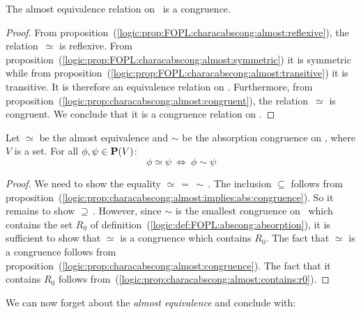 \begin{prop}\label{logic:prop:characabscong:almost:congruence}
The almost equivalence relation on \pv\ is a congruence.
\end{prop}
\begin{proof}
From
proposition~(\ref{logic:prop:FOPL:characabscong:almost:reflexive}),
the relation~$\simeq$ is reflexive. From
proposition~(\ref{logic:prop:FOPL:characabscong:almost:symmetric})
it is symmetric while from
proposition~(\ref{logic:prop:FOPL:characabscong:almost:transitive})
it is transitive. It is therefore an equivalence relation on \pv.
Furthermore, from
proposition~(\ref{logic:prop:characabscong:almost:congruent}), the
relation~$\simeq$ is congruent. We conclude that it is a congruence
relation on \pv.
\end{proof}

\begin{prop}\label{logic:prop:characabscong:almost:is:abs:congruence}
Let $\simeq$ be the almost equivalence and $\sim$ be the absorption
congruence on \pv, where $V$ is a set. For all $\phi,\psi\in\mbox{${\bf P}(V)$}$:
    \[
    \phi\simeq\psi\ \Leftrightarrow\ \phi\sim\psi
    \]
\end{prop}
\begin{proof}
We need to show the equality $\simeq\,=\,\sim\,$. The inclusion
$\subseteq$ follows from
proposition~(\ref{logic:prop:characabscong:almost:implies:abs:congruence}).
So it remains to show $\supseteq$\,. However, since $\sim$ is the
smallest congruence on \pv\ which contains the set $R_{0}$ of
definition~(\ref{logic:def:FOPL:abscong:absorption}), it is
sufficient to show that $\simeq$ is a congruence which contains
$R_{0}$. The fact that $\simeq$ is a congruence follows from
proposition~(\ref{logic:prop:characabscong:almost:congruence}). The
fact that it contains $R_{0}$ follows
from~(\ref{logic:prop:characabscong:almost:contains:r0}).
\end{proof}

We can now forget about the {\em almost equivalence} and conclude
with:

